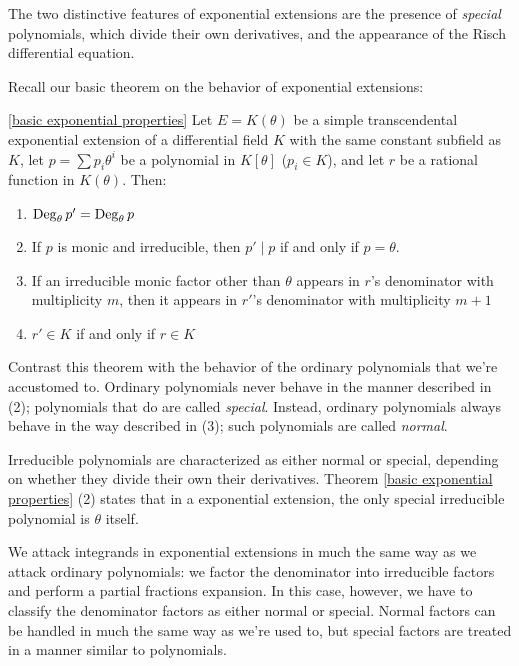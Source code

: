 
\setcounter{chapter}{5}

The two distinctive features of exponential extensions are the
presence of {\it special} polynomials, which divide their own
derivatives, and the appearance of the Risch differential equation.

Recall our basic theorem on the behavior of exponential extensions:

\begin{customthm}{\ref{basic exponential properties}}
Let $E=K(\theta)$ be a simple transcendental exponential extension of
a differential field $K$ with the same constant subfield as $K$,
let $p=\sum p_i \theta^i$ be a polynomial in $K[\theta]$ ($p_i \in K$),
and let $r$ be a rational function in $K(\theta)$. Then:

\begin{enumerate}
\item ${\rm Deg}_\theta\, p' = {\rm Deg}_\theta\, p$
\item If $p$ is monic and irreducible, then $p' \mid p$ if and only if $p = \theta$.
\item If an irreducible monic factor other than $\theta$ appears in $r$'s
denominator with multiplicity $m$,
then it appears in $r'$'s denominator with multiplicity $m+1$
\item $r' \in K$ if and only if $r \in K$
\end{enumerate}

\end{customthm}

Contrast this theorem with the behavior of the ordinary polynomials
that we're accustomed to.  Ordinary polynomials never behave in the
manner described in (2); polynomials that do are called {\it special}.
Instead, ordinary polynomials always behave in the way described in
(3); such polynomials are called {\it normal}.

Irreducible polynomials are characterized as either normal or special,
depending on whether they divide their own their derivatives.
Theorem \ref{basic exponential properties} (2) states that in a
exponential extension, the only special irreducible polynomial is
$\theta$ itself.

\begin{comment}
In a hypertangent extension, the only special
irreducible polynomial is $(\theta^2+1)$.
\end{comment}

We attack integrands in exponential extensions in much the same way as
we attack ordinary polynomials: we factor the denominator into
irreducible factors and perform a partial fractions expansion.  In
this case, however, we have to classify the denominator factors as
either normal or special.  Normal factors can be handled in much the
same way as we're used to, but special factors are treated in a manner
similar to polynomials.

